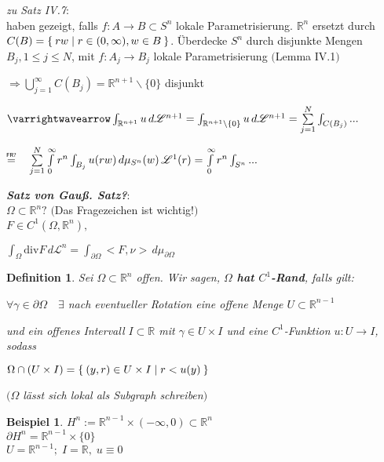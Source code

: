 \documentclass[11pt]{memoir}
\theoremstyle{changebreak}
\newtheorem{Definition}{Definition}[chapter]
\newtheorem{Beispiel}{Beispiel}[chapter]
\newcommand\overequal[1]{\mathrel{\overset{\makebox[0pt]{\mbox{\normalfont\tiny\sffamily $ #1 $}}}{=}}}
\begin{document}
\par\bigskip

\emph{zu Satz IV.7}: \\

haben gezeigt, falls $f: A \rightarrow B \subset S^n$ lokale Parametrisierung. $\mathbb R^n$ ersetzt durch $C(B) = \Set{rw | r \in (0, \infty), w \in B}$. Überdecke $S^n$ durch disjunkte Mengen $B_j, 1 \leq j \leq N$, mit
$f:A_j \rightarrow B_j$ lokale Parametrisierung $($Lemma IV.1$)$ 
\par
$\Rightarrow \bigcup\limits_{j=1}^\infty C(B_j) = \mathbb R^{n+1}\backslash \{0\}$ disjunkt 
\par\bigskip
$\varrightwavearrow \int_{\mathbb R^{n+1}} u \, d\mathscr L^{n+1} = \int_{\mathbb R^{n+1}\backslash \{0\}} u \, d \mathscr L^{n+1} = \sum\limits_{j=1}^N \int_{C(B_j)}...$
\par\bigskip
$\overequal{\text{FR?}} \quad \sum\limits_{j=1}^N \int\limits_0^\infty r^n \int_{B_j} u(rw) \,d\mu_{S^n}(w) \, \mathscr L^1(r) = \int\limits_0^\infty r^n \int_{S^n}...$


\par\bigskip
\emph{\textbf{Satz von Gauß. Satz?}}:\\
$\Omega \subset \mathbb R^n?$ $($Das Fragezeichen ist wichtig!$)$ \\
$F \in C^1(\Omega, \mathbb R^n),$
\begin{center}
	$\int_\Omega \text{div} F \, d\mathscr L^n = \int_{\partial\Omega} <F, \nu> \, d\mu_{\partial\Omega}$
\end{center}

\begin{Definition}
Sei $\Omega \subset \mathbb R^n$ offen. Wir sagen, \textbf{$\Omega$ hat $C^1$-Rand}, falls gilt:
\begin{center}
	$\forall \gamma \in \partial\Omega \quad \exists$ nach eventueller Rotation eine offene Menge $U \subset \mathbb R^{n-1}$ 
\end{center}
und ein offenes Intervall $I \subset \mathbb R$ mit $\gamma \in U \times I$ und eine $C^1$-Funktion $u: U \rightarrow I$, sodass 
\begin{center}
	$\Omega \cap (U \times I) = \Set{(y, r) \in U \times I | r < u(y)}$ 
\end{center}
$(\Omega$ lässt sich lokal als Subgraph schreiben$)$
\end{Definition}


\begin{Beispiel}
$H^n := \mathbb R^{n-1} \times (-\infty, 0) \subset \mathbb R^n$ \\
$\partial H^n = \mathbb R^{n-1} \times \{0\}$ \\
$U = \mathbb R^{n-1};\; I = \mathbb R, \;u \equiv 0$
\end{Beispiel}
\end{document}
